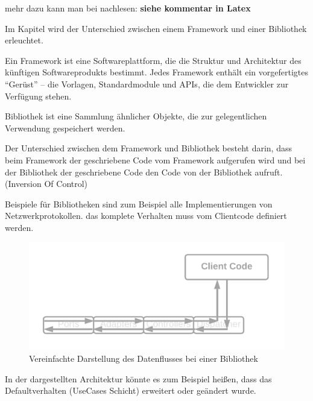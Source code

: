 mehr dazu kann man bei nachlesen: \textbf{siehe kommentar in Latex}%

Im Kapitel wird der Unterschied zwischen einem Framework und einer Bibliothek erleuchtet.

Ein Framework ist eine Softwareplattform, die die Struktur und Architektur des künftigen Softwareprodukts bestimmt.
Jedes Framework enthält ein vorgefertigtes “Gerüst” – die Vorlagen, Standardmodule und APIs, 
die dem Entwickler zur Verfügung stehen.

Bibliothek ist eine Sammlung ähnlicher Objekte, die zur gelegentlichen Verwendung gespeichert werden.

Der Unterschied zwischen dem Framework und Bibliothek besteht darin, 
dass beim Framework der geschriebene Code vom Framework aufgerufen wird 
und bei der Bibliothek der geschriebene Code den Code von der Bibliothek aufruft.
(Inversion Of Control)


Beispiele für Bibliotheken sind zum Beispiel alle Implementierungen von Netzwerkprotokollen.
das komplete Verhalten muss vom Clientcode definiert werden.

\begin{figure}[H]
    \centering
    \includegraphics[width=1\textwidth]{./images/Dataflow Library.png}
    \caption{Vereinfachte Darstellung des Datenflusses bei einer Bibliothek}
    \label{fig:SimpliedDataflowLibrary}
\end{figure}

In der dargestellten Architektur könnte es zum Beispiel heißen, 
dass das Defaultverhalten (UseCases Schicht) erweitert oder geändert wurde.


